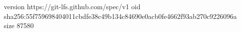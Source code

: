 version https://git-lfs.github.com/spec/v1
oid sha256:55f759698404011cbdfe38c49b134c84690e0acb0fe4662f93ab270c9226096a
size 87580
